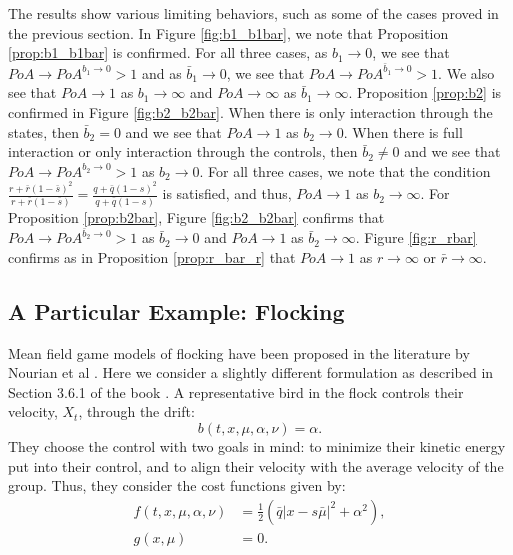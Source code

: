 \documentclass[11pt]{article}
\begin{document}
The results show various limiting behaviors, such as some of the cases proved in the previous section. In Figure \ref{fig:b1_b1bar}, we note that Proposition \ref{prop:b1_b1bar} is confirmed. For all three cases, as $b_1 \to 0$, we see that $PoA \to PoA^{b_1\to 0}>1$ and as $\bar{b}_1 \to 0$, we see that $PoA \to PoA^{\bar{b}_1 \to 0}>1$. We also see that $PoA\to 1$ as $b_1 \to \infty$ and $PoA \to \infty$ as $\bar{b}_1 \to \infty$. Proposition \ref{prop:b2} is confirmed in Figure \ref{fig:b2_b2bar}. When there is only interaction through the states, then $\bar{b}_2=0$ and we see that $PoA \to 1$ as $b_2 \to 0$. When there is full interaction or only interaction through the controls, then $\bar{b}_2\neq0$ and we see that $PoA \to PoA^{b_2 \to 0}>1$ as $b_2 \to 0$. For all three cases, we note that the condition $\frac{r + \bar{r}(1-\bar{s})^2}{r + \bar{r}(1-\bar{s})}= \frac{q + \bar{q}(1-s)^2}{q + \bar{q}(1-s)}$ is satisfied, and thus, $PoA \to 1$ as $b_2 \to \infty$. For Proposition \ref{prop:b2bar}, Figure \ref{fig:b2_b2bar} confirms that $PoA \to PoA^{\bar{b}_2 \to 0}>1$ as $\bar{b}_2 \to 0$ and $PoA \to 1$ as $\bar{b}_2 \to \infty$. Figure \ref{fig:r_rbar} confirms as in Proposition \ref{prop:r_bar_r} that $PoA \to 1$ as $r \to \infty$ or $\bar{r} \to \infty$.

\subsection{\textbf{A Particular Example: Flocking}}
Mean field game models of flocking have been proposed in the literature by Nourian et al \cite{nourian2010synthesis}\cite{nourian2011mean}. Here we consider a slightly different formulation as described in Section 3.6.1 of the book \cite{Carmona_book}. A representative bird in the flock controls their velocity, $X_t$, through the drift:
\begin{equation*}
    b(t,x,\mu,\alpha,\nu)=\alpha.
\end{equation*}
They choose the control with two goals in mind: to minimize their kinetic energy put into their control, and to align their velocity with the average velocity of the group. Thus, they consider the cost functions given by:
\begin{equation*}
\begin{split}
    f(t,x,\mu,\alpha,\nu)&=\frac{1}{2}\left(\bar{q}|x-s\bar{\mu}|^2 +\alpha^2 \right), \\
    g(x,\mu)&=0.
\end{split}
\end{equation*}
\end{document}
